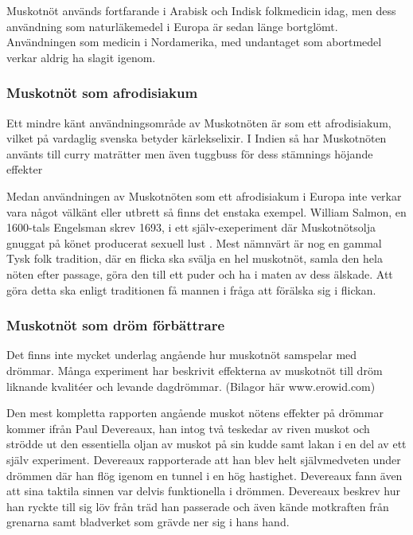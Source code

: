Muskotnöt används fortfarande i Arabisk och Indisk folkmedicin idag, men dess användning som naturläkemedel i Europa är sedan länge bortglömt.
Användningen som medicin i Nordamerika, med undantaget som abortmedel verkar aldrig ha slagit igenom.


\subsubsection{Muskotnöt som afrodisiakum}

Ett mindre känt användningsområde av Muskotnöten är som ett afrodisiakum, vilket på vardaglig svenska betyder
kärlekselixir.
I Indien så har Muskotnöten använts till curry maträtter men även tuggbuss för dess stämnings höjande effekter \cite{ratsch2005encyclopedia}

Medan användningen av Muskotnöten som ett afrodisiakum i Europa inte verkar vara något välkänt eller utbrett så
finns det enstaka exempel. William Salmon, en 1600-tals Engelsman skrev 1693, i ett själv-exeperiment där
Muskotnötsolja gnuggat på könet producerat sexuell lust \cite{RudgleyR}.
Mest nämnvärt är nog en gammal Tysk folk tradition, där en flicka ska svälja en hel muskotnöt, samla den hela nöten
efter passage, göra den till ett puder och ha i maten av dess älskade. Att göra detta ska enligt traditionen
få mannen i fråga att förälska sig i flickan. \cite{ratsch2005encyclopedia}



\subsubsection{Muskotnöt som dröm förbättrare}

Det finns inte mycket underlag angående hur muskotnöt samspelar med drömmar. Många experiment har beskrivit effekterna
av muskotnöt till dröm liknande kvalitéer och levande dagdrömmar. \cite{entheogenreview}
(Bilagor här www.erowid.com)

Den mest kompletta rapporten angående muskot nötens effekter på drömmar kommer ifrån Paul Devereaux, han intog
två teskedar av riven muskot och strödde ut den essentiella oljan av muskot på sin kudde samt lakan i en del
av ett själv experiment. Devereaux rapporterade att han blev helt självmedveten under drömmen där han flög igenom
en tunnel i en hög hastighet. Devereaux fann även att sina taktila sinnen var delvis funktionella i drömmen.
Devereaux beskrev hur han ryckte till sig löv från träd han passerade och även kände motkraften från grenarna samt
bladverket som grävde ner sig i hans hand. \cite{RudgleyR}

